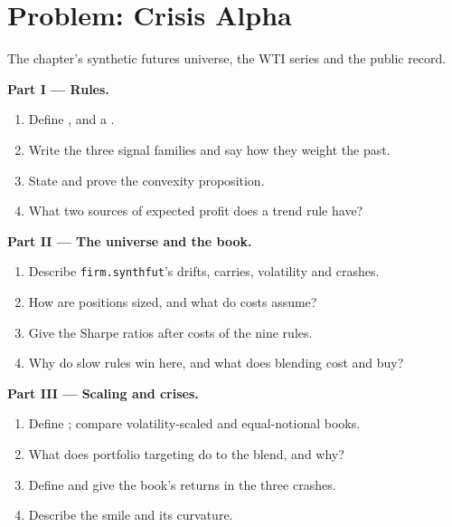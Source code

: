 \section{Problem: Crisis Alpha}

\begin{problem}\label{pb:s1:trend-following:1}
The chapter's synthetic futures universe, the WTI series and the public record.

\medskip\noindent\textbf{Part I --- Rules.}
\begin{enumerate}
\item Define ,  and a .
\item Write the three signal families and say how they weight the past.
\item State and prove the convexity proposition.
\item What two sources of expected profit does a trend rule have?
\end{enumerate}

\medskip\noindent\textbf{Part II --- The universe and the book.}
\begin{enumerate}[resume]
\item Describe \texttt{firm.synthfut}'s drifts, carries, volatility and crashes.
\item How are positions sized, and what do costs assume?
\item Give the Sharpe ratios after costs of the nine rules.
\item Why do slow rules win here, and what does blending cost and buy?
\end{enumerate}

\medskip\noindent\textbf{Part III --- Scaling and crises.}
\begin{enumerate}[resume]
\item Define ; compare volatility-scaled and equal-notional books.
\item What does portfolio targeting do to the blend, and why?
\item Define  and give the book's returns in the three crashes.
\item Describe the smile and its curvature.
\end{enumerate}


\end{problem}
